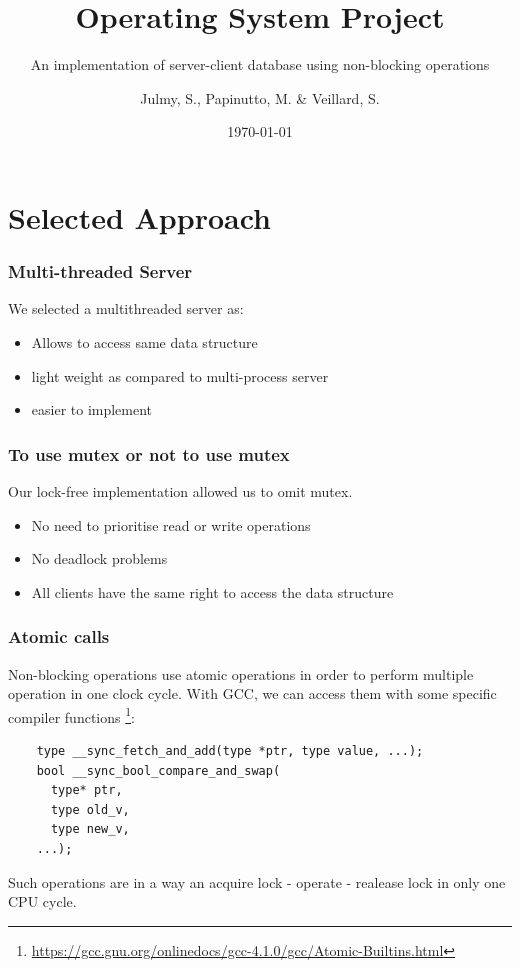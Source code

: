 \documentclass{bredelebeamer}
\title[OS Project]{Operating System Project}
\subtitle{An implementation of server-client database using non-blocking operations}
\author{Julmy, S., Papinutto, M. \& Veillard, S.}
\institute[UniFr]{University of Fribourg}
\date{\today}
\begin{document}
\maketitle

\section{Selected Approach}

\begin{frame}
  \frametitle{Multi-threaded Server}
  We selected a multithreaded server as: \\
  \begin{itemize}
  \item Allows to access same data structure
  \item light weight as compared to multi-process server
  \item easier to implement
  \end{itemize}
\end{frame}

\begin{frame}
  \frametitle{To use mutex or not to use mutex}
  Our lock-free implementation allowed us to omit mutex.
  \begin{itemize}
  \item No need to prioritise read or write operations
  \item No deadlock problems
  \item All clients have the same right to access the data structure
  \end{itemize}
\end{frame}

\begin{frame}[fragile]
  \frametitle{Atomic calls}
  Non-blocking operations use atomic operations in order to perform multiple
  operation in one clock cycle. With GCC, we can access them with some
  specific compiler functions
  \footnote{\url{https://gcc.gnu.org/onlinedocs/gcc-4.1.0/gcc/Atomic-Builtins.html}}:
  
  \begin{verbatim}
    type __sync_fetch_and_add(type *ptr, type value, ...);
    bool __sync_bool_compare_and_swap(
      type* ptr,
      type old_v,
      type new_v,
    ...);
  \end{verbatim}

  Such operations are in a way an acquire lock - operate - realease lock in
  only one CPU cycle.
\end{frame}
\end{document}
